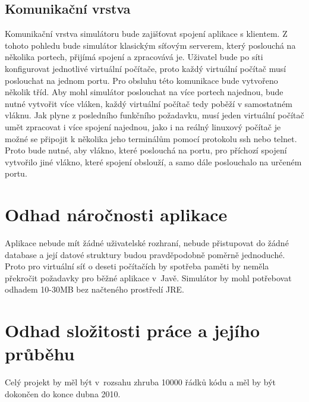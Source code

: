 \subsection{Komunikační vrstva}
Komunikační vrstva simulátoru bude zajišťovat spojení aplikace s klientem. Z tohoto pohledu bude simulátor klasickým síťovým serverem, který poslouchá na několika portech, přijímá spojení a zpracovává je. Uživatel bude po síti konfigurovat jednotlivé virtuální počítače, proto každý virtuální počítač musí poslouchat na jednom portu. Pro obsluhu této komunikace bude vytvořeno několik tříd. Aby mohl simulátor poslouchat na více portech najednou, bude nutné vytvořit více vláken, každý virtuální počítač tedy poběží v samostatném vláknu. Jak plyne z posledního funkčního požadavku, musí jeden virtuální počítač umět zpracovat i více spojení najednou, jako i na reálný linuxový počítač je možné se připojit k několika jeho terminálům pomocí protokolu ssh nebo telnet. Proto bude nutné, aby vlákno, které poslouchá na portu, pro příchozí spojení vytvořilo jiné vlákno, které spojení obslouží, a samo dále poslouchalo na určeném portu. 




\section{Odhad náročnosti aplikace}

Aplikace nebude mít žádné uživatelské rozhraní, nebude přistupovat do žádné database a její datové struktury budou pravděpodobně poměrně jednoduché. Proto pro virtuální síť o deseti počítačích by spotřeba paměti by neměla překročit požadavky pro běžné aplikace v~Javě. Simulátor by mohl potřebovat odhadem 10-30MB bez načteného prostředí JRE.




\section{Odhad složitosti práce a jejího průběhu}

Celý projekt by měl být v~rozsahu zhruba 10000 řádků kódu a měl by být dokončen do konce dubna 2010.
